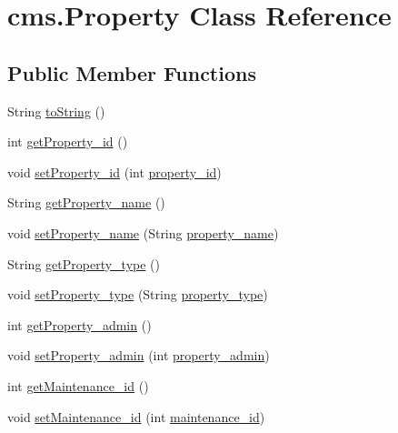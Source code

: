 \hypertarget{classcms_1_1_property}{}\section{cms.\+Property Class Reference}
\label{classcms_1_1_property}
\subsection*{Public Member Functions}
\begin{DoxyCompactItemize}
\item 
String \mbox{\hyperlink{classcms_1_1_property_a89c15a4d47d9b1ff2870465759e71d35}{to\+String}} ()
\item 
int \mbox{\hyperlink{classcms_1_1_property_a8caddf6bd3a8062b52dff238a8697408}{get\+Property\+\_\+id}} ()
\item 
void \mbox{\hyperlink{classcms_1_1_property_aa8ff81bc406f23695423cfd7aa0aa78f}{set\+Property\+\_\+id}} (int \mbox{\hyperlink{classcms_1_1_property_a599f759f4e0076578bf5a39c494a978d}{property\+\_\+id}})
\item 
String \mbox{\hyperlink{classcms_1_1_property_a884055b9b3437ae8b18247ca299e4b4e}{get\+Property\+\_\+name}} ()
\item 
void \mbox{\hyperlink{classcms_1_1_property_aac6a658c4a914669b1def4c968c513b5}{set\+Property\+\_\+name}} (String \mbox{\hyperlink{classcms_1_1_property_a35fcc951b43bfcb151fae422a0a61a1a}{property\+\_\+name}})
\item 
String \mbox{\hyperlink{classcms_1_1_property_abba91ad14f2ce0f5b7a66ee26c479a8f}{get\+Property\+\_\+type}} ()
\item 
void \mbox{\hyperlink{classcms_1_1_property_aff794f4d992112f05233969709e02813}{set\+Property\+\_\+type}} (String \mbox{\hyperlink{classcms_1_1_property_a16bbd8f821050042e83a42d814fc42cc}{property\+\_\+type}})
\item 
int \mbox{\hyperlink{classcms_1_1_property_abfd65ea77f67d239dc1d7147421aceb9}{get\+Property\+\_\+admin}} ()
\item 
void \mbox{\hyperlink{classcms_1_1_property_ad3fc9f749278cc0592f8d0f4b82af1d2}{set\+Property\+\_\+admin}} (int \mbox{\hyperlink{classcms_1_1_property_a24082a4e64c157c5ef3b9238f58dba4c}{property\+\_\+admin}})
\item 
int \mbox{\hyperlink{classcms_1_1_property_aeafbbef3deb1c073082ee3f686f38191}{get\+Maintenance\+\_\+id}} ()
\item 
void \mbox{\hyperlink{classcms_1_1_property_a9132ff5382b5d157101d50434dac0a97}{set\+Maintenance\+\_\+id}} (int \mbox{\hyperlink{classcms_1_1_property_a8da95f059e18d03376e179cbe5861043}{maintenance\+\_\+id}})

\end{DoxyCompactItemize}
